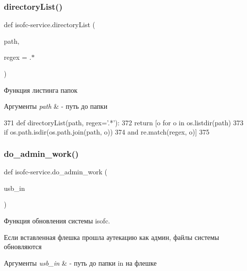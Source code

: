 \subsubsection{\texorpdfstring{directory\+List()}{directoryList()}}
{\footnotesize\ttfamily def isofc-\/service.\+directory\+List (\begin{DoxyParamCaption}\item[{}]{path,  }\item[{}]{regex = {\ttfamily \textquotesingle{}.$\ast$\textquotesingle{}} }\end{DoxyParamCaption})}



Функция листинга папок 


\begin{DoxyParams}{Аргументы}
{\em path} & -\/ путь до папки \\
\hline
\end{DoxyParams}

\begin{DoxyCode}
371 \textcolor{keyword}{def }directoryList(path, regex='.*'):
372     \textcolor{keywordflow}{return} [o \textcolor{keywordflow}{for} o \textcolor{keywordflow}{in} os.listdir(path)
373             \textcolor{keywordflow}{if} os.path.isdir(os.path.join(path, o))
374             \textcolor{keywordflow}{and} re.match(regex, o)]
375 
\end{DoxyCode}
\mbox{\label{isofc-service_8py_file_a2121e73bea9129e558eba2f542c9ae75}} 
\subsubsection{\texorpdfstring{do\+\_\+admin\+\_\+work()}{do\_admin\_work()}}
{\footnotesize\ttfamily def isofc-\/service.\+do\+\_\+admin\+\_\+work (\begin{DoxyParamCaption}\item[{}]{usb\+\_\+in }\end{DoxyParamCaption})}



Функция обновления системы isofc. 

Если вставленная флешка прошла аутекацию как админ, файлы системы обновляются


\begin{DoxyParams}{Аргументы}
{\em usb\+\_\+in} & -\/ путь до папки in на флешке \\
\hline
\end{DoxyParams}

